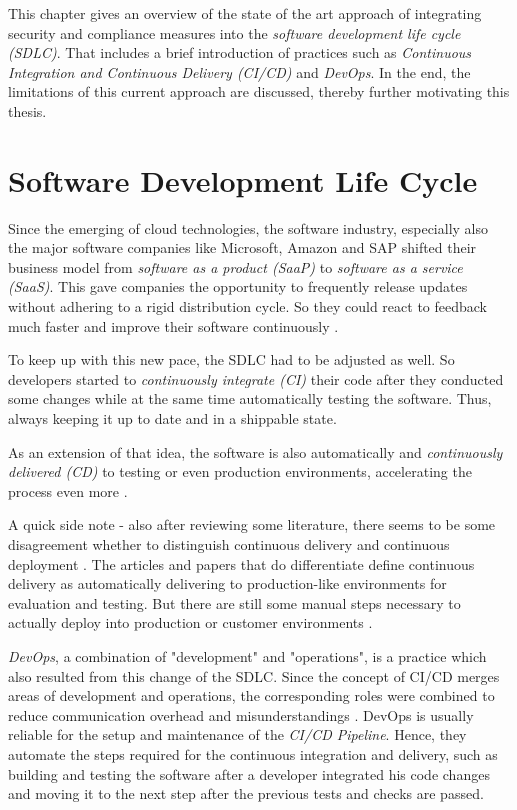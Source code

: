 
This chapter gives an overview of the state of the art approach of integrating security and compliance measures into the \textit{software development life cycle (SDLC)}. That includes a brief introduction of practices such as \textit{Continuous Integration and Continuous Delivery (CI/CD)} and \textit{DevOps}. In the end, the limitations of this current approach are discussed, thereby further motivating this thesis. 

\section{Software Development Life Cycle}
Since the emerging of cloud technologies, the software industry, especially also the major software companies like Microsoft, Amazon and SAP shifted their business model from \textit{software as a product (SaaP)} to \textit{software as a service (SaaS)}. This gave companies the opportunity to frequently release updates without adhering to a rigid distribution cycle. So they could react to feedback much faster and improve their software continuously \cite{DevSecOps, ContinuousSecurity}.\par
To keep up with this new pace, the SDLC had to be adjusted as well. So developers started to \emph{continuously integrate (CI)} their code after they conducted some changes while at the same time automatically testing the software. Thus, always keeping it up to date and in a shippable state.\par
As an extension of that idea, the software is also automatically and \emph{continuously delivered (CD)} to testing or even production environments, accelerating the process even more \cite{CICD}.\par 
A quick side note - also after reviewing some literature, there seems to be some disagreement whether to distinguish continuous delivery and continuous deployment \cite{CICD, DevSecOps}. The articles and papers that do differentiate define continuous delivery as automatically delivering to production-like environments for evaluation and testing. But there are still some manual steps necessary to actually deploy into production or customer environments \cite{CICD, CICDDebate1, SecureCloudApplications}.\par
\emph{DevOps}, a combination of "development" and "operations", is a practice which also resulted from this change of the SDLC. Since the concept of CI/CD merges areas of development and operations, the corresponding roles were combined to reduce communication overhead and misunderstandings \cite{SecureCloudApplications}. DevOps is usually reliable for the setup and maintenance of the \emph{CI/CD Pipeline}. Hence, they automate the steps required for the continuous integration and delivery, such as building and testing the software after a developer integrated his code changes and moving it to the next step after the previous tests and checks are passed. 

